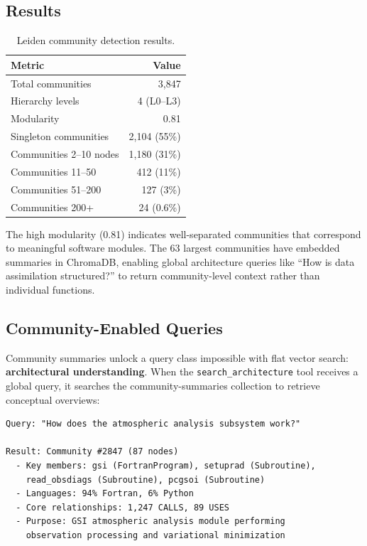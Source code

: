 \documentclass[11pt,letterpaper]{article}
\begin{document}
\subsection{Results}

\begin{table}[H]
\centering
\caption{Leiden community detection results.}
\label{tab:leiden}
\begin{tabular}{@{}lr@{}}
\toprule
\textbf{Metric} & \textbf{Value} \\
\midrule
Total communities       & 3,847 \\
Hierarchy levels        & 4 (L0--L3) \\
Modularity              & 0.81 \\
Singleton communities   & 2,104 (55\%) \\
Communities 2--10 nodes & 1,180 (31\%) \\
Communities 11--50      & 412 (11\%) \\
Communities 51--200     & 127 (3\%) \\
Communities 200+        & 24 (0.6\%) \\
\bottomrule
\end{tabular}
\end{table}

The high modularity (0.81) indicates well-separated communities that
correspond to meaningful software modules. The 63 largest
communities have embedded summaries in ChromaDB, enabling global
architecture queries like ``How is data assimilation structured?''
to return community-level context rather than individual functions.

\subsection{Community-Enabled Queries}

Community summaries unlock a query class impossible with flat vector
search: \textbf{architectural understanding}. When the
\texttt{search\_architecture} tool receives a global query, it searches
the community-summaries collection to retrieve conceptual overviews:

\begin{lstlisting}[language={}, caption={Community-based architecture query}]
Query: "How does the atmospheric analysis subsystem work?"

Result: Community #2847 (87 nodes)
  - Key members: gsi (FortranProgram), setuprad (Subroutine),
    read_obsdiags (Subroutine), pcgsoi (Subroutine)
  - Languages: 94% Fortran, 6% Python
  - Core relationships: 1,247 CALLS, 89 USES
  - Purpose: GSI atmospheric analysis module performing
    observation processing and variational minimization
\end{lstlisting}
\end{document}
